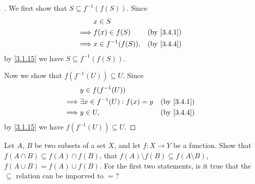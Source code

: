 \begin{proof}[]
  We first show that \(S \subseteq f^{-1}(f(S))\).
  Since
  \begin{align*}
             & x \in S                             \\
    \implies & f(x) \in f(S)       &  & \by{3.4.1} \\
    \implies & x \in f^{-1}(f(S)), &  & \by{3.4.4}
  \end{align*}
  by \cref{3.1.15} we have \(S \subseteq f^{-1}(f(S))\).

  Now we show that \(f(f^{-1}(U)) \subseteq U\).
  Since
  \begin{align*}
             & y \in f(f^{-1}(U))                                 \\
    \implies & \exists x \in f^{-1}(U) : f(x) = y &  & \by{3.4.1} \\
    \implies & y \in U,                           &  & \by{3.4.4}
  \end{align*}
  by \cref{3.1.15} we have \(f(f^{-1}(U)) \subseteq U\).
\end{proof}

\begin{ex}\label{ex:3.4.3}
  Let \(A\), \(B\) be two subsets of a set \(X\), and let \(f : X \to Y\) be a function.
  Show that \(f(A \cap B) \subseteq f(A) \cap f(B)\), that \(f(A) \setminus f(B) \subseteq f(A \setminus B)\), \(f(A \cup B) = f(A) \cup f(B)\).
  For the first two statements, is it true that the \(\subseteq\) relation can be imporved to \(=\)?
\end{ex}

